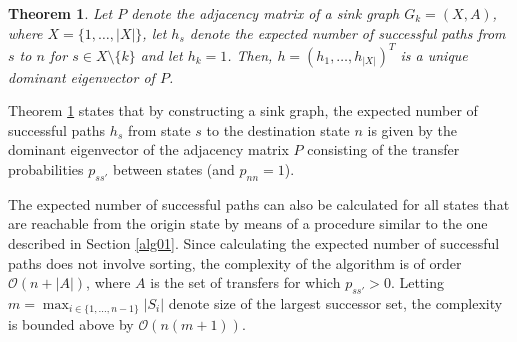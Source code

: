 \documentclass[dissertation,draft*]{aaltoseries}
\newtheorem{theorem}{Theorem}
\begin{document}
\begin{theorem}
\label{polut2}
Let $P$ denote the adjacency matrix of a sink graph $G_k=(X,A)$, where $X=\{1,\ldots,|X|\}$,  
let $h_s$ denote the expected number of successful paths from $s$ to $n$ for $s \in X \setminus \{k\}$ and let $h_k=1$. 
Then, $h=(h_1,\ldots,h_{|X|})^T$ is a unique dominant eigenvector of $P$.
\end{theorem}

Theorem \ref{polut2} states that by constructing a sink graph, the expected number of successful paths $h_s$ from state 
$s$ to the destination state $n$
is given by the dominant eigenvector of the adjacency matrix $P$ consisting of the transfer probabilities $p_{ss'}$
between states (and $p_{nn}=1$). 


The expected number of successful paths can also be calculated for all states that are reachable from the 
origin state by means of a procedure similar to the one described in Section \ref{alg01}.
Since calculating the expected number of successful paths does not involve sorting, the complexity of the algorithm 
is of order $\mathcal{O}(n+|A|)$, where $A$ is the set of transfers for which $p_{ss'} > 0$.
Letting $m = \max_{i \in \{1,\ldots,n-1\}} |S_i|$ denote size of the largest successor set, the complexity
is bounded above by $\mathcal{O}(n(m+1))$.
\end{document}
